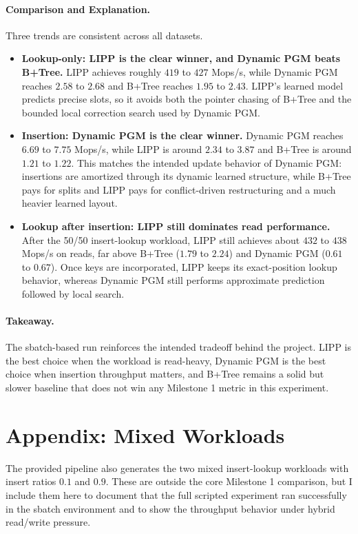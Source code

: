 \documentclass[10pt]{article}
\begin{document}
\paragraph{Comparison and Explanation.}
Three trends are consistent across all datasets.
\begin{itemize}
  \item \textbf{Lookup-only: LIPP is the clear winner, and Dynamic PGM beats B+Tree.} LIPP achieves roughly \(419\) to \(427\) Mops/s, while Dynamic PGM reaches \(2.58\) to \(2.68\) and B+Tree reaches \(1.95\) to \(2.43\). LIPP's learned model predicts precise slots, so it avoids both the pointer chasing of B+Tree and the bounded local correction search used by Dynamic PGM.
  \item \textbf{Insertion: Dynamic PGM is the clear winner.} Dynamic PGM reaches \(6.69\) to \(7.75\) Mops/s, while LIPP is around \(2.34\) to \(3.87\) and B+Tree is around \(1.21\) to \(1.22\). This matches the intended update behavior of Dynamic PGM: insertions are amortized through its dynamic learned structure, while B+Tree pays for splits and LIPP pays for conflict-driven restructuring and a much heavier learned layout.
  \item \textbf{Lookup after insertion: LIPP still dominates read performance.} After the 50/50 insert-lookup workload, LIPP still achieves about \(432\) to \(438\) Mops/s on reads, far above B+Tree (\(1.79\) to \(2.24\)) and Dynamic PGM (\(0.61\) to \(0.67\)). Once keys are incorporated, LIPP keeps its exact-position lookup behavior, whereas Dynamic PGM still performs approximate prediction followed by local search.
\end{itemize}

\paragraph{Takeaway.}
The sbatch-based run reinforces the intended tradeoff behind the project. LIPP is the best choice when the workload is read-heavy, Dynamic PGM is the best choice when insertion throughput matters, and B+Tree remains a solid but slower baseline that does not win any Milestone 1 metric in this experiment.

\clearpage
\section*{Appendix: Mixed Workloads}
The provided pipeline also generates the two mixed insert-lookup workloads with insert ratios \(0.1\) and \(0.9\). These are outside the core Milestone 1 comparison, but I include them here to document that the full scripted experiment ran successfully in the sbatch environment and to show the throughput behavior under hybrid read/write pressure.
\end{document}
